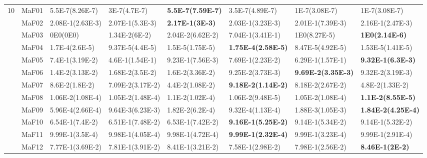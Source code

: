 \documentclass[]{article}
\begin{document}
\begin{landscape}
\begin{table}
\begin{footnotesize}
\begin{tabular}{|l|l|l|l|l|l|l|l|}
\multirow{15}{*}{10} & MaF01 & \cellcolor{gray95} 5.5E-7(8.26E-7) & \cellcolor{gray95} 3E-7(4.7E-7) & \cellcolor{gray95} {\bf 5.5E-7(7.59E-7)} & \cellcolor{gray95} 3.5E-7(4.89E-7) & \cellcolor{gray95} 1E-7(3.08E-7) & \cellcolor{gray95} 1E-7(3.08E-7)\\
 & MaF02 & 2.08E-1(2.63E-3) & 2.07E-1(5.3E-3) & \cellcolor{gray95} {\bf 2.17E-1(3E-3)} & 2.03E-1(3.23E-3) & 2.01E-1(7.39E-3) & \cellcolor{gray95} 2.16E-1(2.47E-3)\\
 & MaF03 & 0E0(0E0) & 1.34E-2(6E-2) & 2.04E-2(6.62E-2) & 7.04E-1(3.41E-1) & \cellcolor{gray95} 1E0(8.27E-5) & \cellcolor{gray95} {\bf 1E0(2.14E-6)}\\
 & MaF04 & \cellcolor{gray95} 1.7E-4(2.6E-5) & 9.37E-5(4.4E-5) & 1.5E-5(1.75E-5) & \cellcolor{gray95} {\bf 1.75E-4(2.58E-5)} & 8.47E-5(4.92E-5) & 1.53E-5(1.41E-5)\\
 & MaF05 & 7.4E-1(3.19E-2) & 4.6E-1(1.54E-1) & \cellcolor{gray95} 9.23E-1(7.56E-3) & 7.69E-1(2.23E-2) & 6.29E-1(1.57E-1) & \cellcolor{gray95} {\bf 9.32E-1(6.3E-3)}\\
 & MaF06 & 1.4E-2(3.13E-2) & 1.68E-2(3.5E-2) & 1.6E-2(3.36E-2) & \cellcolor{gray95} 9.25E-2(3.73E-3) & \cellcolor{gray95} {\bf 9.69E-2(3.35E-3)} & \cellcolor{gray95} 9.32E-2(3.19E-3)\\
 & MaF07 & \cellcolor{gray95} 8.6E-2(1.8E-2) & \cellcolor{gray95} 7.09E-2(3.17E-2) & 4.4E-2(1.08E-2) & \cellcolor{gray95} {\bf 9.18E-2(1.14E-2)} & \cellcolor{gray95} 8.18E-2(2.67E-2) & 4.8E-2(1.33E-2)\\
 & MaF08 & 1.06E-2(1.08E-4) & 1.05E-2(1.48E-4) & \cellcolor{gray95} 1.1E-2(1.02E-4) & 1.06E-2(9.48E-5) & 1.05E-2(1.08E-4) & \cellcolor{gray95} {\bf 1.1E-2(8.55E-5)}\\
 & MaF09 & 5.96E-4(2.66E-4) & 9.64E-3(6.23E-3) & \cellcolor{gray95} 1.82E-2(6.2E-4) & 9.32E-4(1.13E-4) & 1.88E-3(1.05E-3) & \cellcolor{gray95} {\bf 1.84E-2(4.25E-4)}\\
 & MaF10 & 6.54E-1(7.4E-2) & 6.51E-1(7.48E-2) & 6.53E-1(7.42E-2) & \cellcolor{gray95} {\bf 9.16E-1(5.25E-2)} & \cellcolor{gray95} 9.14E-1(5.34E-2) & \cellcolor{gray95} 9.14E-1(5.32E-2)\\
 & MaF11 & \cellcolor{gray95} 9.99E-1(3.5E-4) & 9.98E-1(4.05E-4) & 9.98E-1(4.72E-4) & \cellcolor{gray95} {\bf 9.99E-1(2.32E-4)} & 9.99E-1(3.23E-4) & \cellcolor{gray95} 9.99E-1(2.91E-4)\\
 & MaF12 & 7.77E-1(3.69E-2) & 7.81E-1(3.91E-2) & \cellcolor{gray95} 8.41E-1(3.21E-2) & 7.58E-1(2.98E-2) & 7.98E-1(2.56E-2) & \cellcolor{gray95} {\bf 8.46E-1(2E-2)}\\

\end{tabular}
\end{footnotesize}
\end{table}
\end{landscape}
\end{document}
